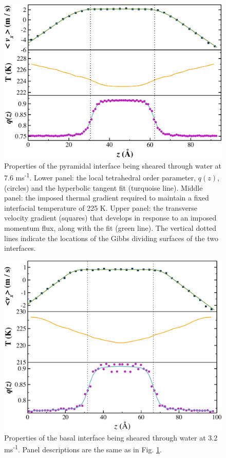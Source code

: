 \begin{figure}
\includegraphics[width=\linewidth]{Figures/Pyr_comic_strip}
\caption{\label{fig:pyrComic} Properties of the pyramidal
  interface being sheared through water at 7.6
  ms\textsuperscript{-1}. Lower panel: the local tetrahedral order
  parameter, $q(z)$, (circles) and the hyperbolic tangent fit
  (turquoise line).  Middle panel: the imposed thermal gradient
  required to maintain a fixed interfacial temperature of 225 K. Upper
  panel: the transverse velocity gradient (squares) that develops in
  response to an imposed momentum flux, along with the fit (green
  line). The vertical dotted lines indicate the locations of the Gibbs
  dividing surfaces of the two interfaces.}
\end{figure}

\begin{figure}
\includegraphics[width=\linewidth]{Figures/Bas_comic_strip}
\caption{\label{fig:bComic} Properties of the basal interface being
  sheared through water at 3.2 ms\textsuperscript{-1}.  Panel
  descriptions are the same as in Fig. \ref{fig:pyrComic}.}
\end{figure}

